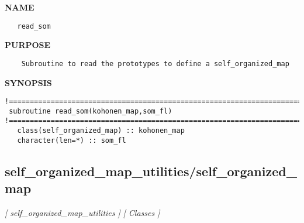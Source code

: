 \documentclass{article}
\begin{document}
\label{ch:robo53}
\label{ch:self_organized_map_utilities_read_som}
\textbf{NAME}
\begin{verbatim}
   read_som
\end{verbatim}
\textbf{PURPOSE}
\begin{verbatim}
    Subroutine to read the prototypes to define a self_organized_map 
\end{verbatim}
\textbf{SYNOPSIS}
\begin{verbatim}
!========================================================================================
 subroutine read_som(kohonen_map,som_fl)
!========================================================================================
   class(self_organized_map) :: kohonen_map
   character(len=*) :: som_fl
\end{verbatim}
\newpage
\subsection{self\_organized\_map\_utilities/self\_organized\_map}
\textsl{[ self\_organized\_map\_utilities ]}
\textsl{[ Classes ]}
\end{document}
